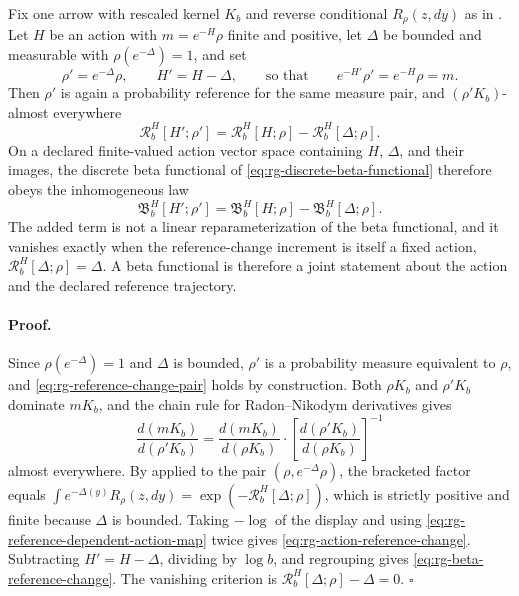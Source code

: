Fix one arrow with rescaled kernel $K_b$ and reverse conditional
$R_\rho(z,dy)$ as in .  Let $H$ be an action with
$m=e^{-H}\rho$ finite and positive, let $\Delta$ be bounded and measurable with
$\rho(e^{-\Delta})=1$, and set
\begin{equation}
\rho'=e^{-\Delta}\rho,
\qquad
H'=H-\Delta,
\qquad\text{so that}\qquad
e^{-H'}\rho'=e^{-H}\rho=m.
\label{eq:rg-reference-change-pair}
\end{equation}
Then $\rho'$ is again a probability reference for the same measure pair, and
$(\rho'K_b)$-almost everywhere
\begin{equation}
\mathcal R_b^H[H';\rho']
=\mathcal R_b^H[H;\rho]-\mathcal R_b^H[\Delta;\rho].
\label{eq:rg-action-reference-change}
\end{equation}
On a declared finite-valued action vector space containing $H$, $\Delta$, and
their images, the discrete beta functional of
\eqref{eq:rg-discrete-beta-functional} therefore obeys the inhomogeneous law
\begin{equation}
\mathfrak B_b^H[H';\rho']
=\mathfrak B_b^H[H;\rho]-\mathfrak B_b^H[\Delta;\rho].
\label{eq:rg-beta-reference-change}
\end{equation}
The added term is not a linear reparameterization of the beta functional, and it
vanishes exactly when the reference-change increment is itself a fixed action,
$\mathcal R_b^H[\Delta;\rho]=\Delta$.  A beta functional is therefore a joint
statement about the action and the declared reference trajectory.

\paragraph{Proof.}
Since $\rho(e^{-\Delta})=1$ and $\Delta$ is bounded, $\rho'$ is a probability
measure equivalent to $\rho$, and \eqref{eq:rg-reference-change-pair} holds by
construction.  Both $\rho K_b$ and $\rho'K_b$ dominate $mK_b$, and the chain
rule for Radon--Nikodym derivatives gives
\[
\frac{d(mK_b)}{d(\rho'K_b)}
=\frac{d(mK_b)}{d(\rho K_b)}
\cdot\left[\frac{d(\rho'K_b)}{d(\rho K_b)}\right]^{-1}
\]
almost everywhere.  By  applied to the pair
$(\rho,e^{-\Delta}\rho)$, the bracketed factor equals
$\int e^{-\Delta(y)}R_\rho(z,dy)=\exp(-\mathcal R_b^H[\Delta;\rho])$, which is
strictly positive and finite because $\Delta$ is bounded.  Taking $-\log$ of the
display and using \eqref{eq:rg-reference-dependent-action-map} twice gives
\eqref{eq:rg-action-reference-change}.  Subtracting
$H'=H-\Delta$, dividing by $\log b$, and regrouping gives
\eqref{eq:rg-beta-reference-change}.  The vanishing criterion is
$\mathcal R_b^H[\Delta;\rho]-\Delta=0$.  $\square$

